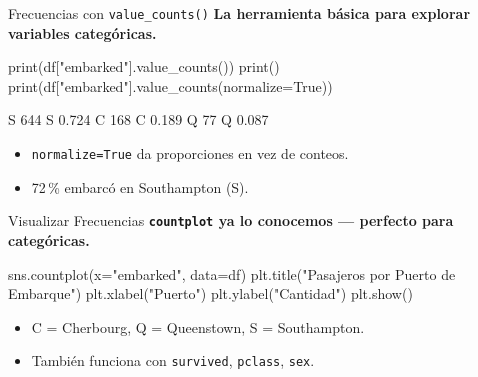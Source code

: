 \documentclass[aspectratio=169, 11pt]{beamer}
\begin{document}
\begin{frame}[fragile,shrink=28]{Frecuencias con \texttt{value\_counts()}}
  \vspace{-6pt}
  {\footnotesize\color{arcaDark}\bfseries
    La herramienta básica para explorar variables categóricas.}

  \vspace{4pt}
  \begin{pyblock}
print(df["embarked"].value_counts())
print()
print(df["embarked"].value_counts(normalize=True))
  \end{pyblock}

  \vspace{4pt}
  \begin{outputblock}
S    644        S    0.724
C    168        C    0.189
Q     77        Q    0.087
  \end{outputblock}

  \vspace{4pt}
  {\scriptsize\color{textMuted}
  \begin{itemize}\setlength{\itemsep}{3pt}
    \item[{\color{arcaRed}\scriptsize\faArrowRight}]
      \texttt{normalize=True} da proporciones en vez de conteos.
    \item[{\color{arcaRed}\scriptsize\faArrowRight}]
      72\,\% embarcó en Southampton (S).
  \end{itemize}
  }
\end{frame}

\begin{frame}[fragile,shrink=28]{Visualizar Frecuencias}
  \vspace{-6pt}
  {\footnotesize\color{arcaDark}\bfseries
    \texttt{countplot} ya lo conocemos --- perfecto para categóricas.}

  \vspace{4pt}
  \begin{pyblock}
sns.countplot(x="embarked", data=df)
plt.title("Pasajeros por Puerto de Embarque")
plt.xlabel("Puerto")
plt.ylabel("Cantidad")
plt.show()
  \end{pyblock}

  \vspace{4pt}
  {\scriptsize\color{textMuted}
  \begin{itemize}\setlength{\itemsep}{3pt}
    \item[{\color{arcaRed}\scriptsize\faArrowRight}]
      C = Cherbourg, Q = Queenstown, S = Southampton.
    \item[{\color{arcaRed}\scriptsize\faArrowRight}]
      También funciona con \texttt{survived}, \texttt{pclass}, \texttt{sex}.
  \end{itemize}
  }
\end{frame}
\end{document}
